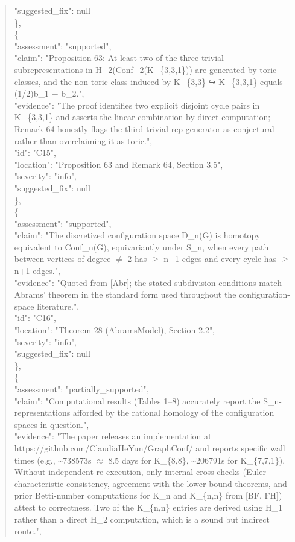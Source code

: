 \documentclass[11pt]{article}
\begin{document}
\begin{quote}
      "suggested\_fix": null\\
    \},\\
    \{\\
      "assessment": "supported",\\
      "claim": "Proposition 63: At least two of the three trivial subrepresentations in H\_2(Conf\_2(K\_\{3,3,1\})) are generated by toric classes, and the non-toric class induced by K\_\{3,3\} ↪ K\_\{3,3,1\} equals (1/2)b\_1 \ensuremath{-} b\_2.",\\
      "evidence": "The proof identifies two explicit disjoint cycle pairs in K\_\{3,3,1\} and asserts the linear combination by direct computation; Remark 64 honestly flags the third trivial-rep generator as conjectural rather than overclaiming it as toric.",\\
      "id": "C15",\\
      "location": "Proposition 63 and Remark 64, Section 3.5",\\
      "severity": "info",\\
      "suggested\_fix": null\\
    \},\\
    \{\\
      "assessment": "supported",\\
      "claim": "The discretized configuration space D\_n(G) is homotopy equivalent to Conf\_n(G), equivariantly under S\_n, when every path between vertices of degree \ensuremath{\ne} 2 has \ensuremath{\ge} n\ensuremath{-}1 edges and every cycle has \ensuremath{\ge} n+1 edges.",\\
      "evidence": "Quoted from [Abr]; the stated subdivision conditions match Abrams' theorem in the standard form used throughout the configuration-space literature.",\\
      "id": "C16",\\
      "location": "Theorem 28 (AbramsModel), Section 2.2",\\
      "severity": "info",\\
      "suggested\_fix": null\\
    \},\\
    \{\\
      "assessment": "partially\_supported",\\
      "claim": "Computational results (Tables 1--8) accurately report the S\_n-representations afforded by the rational homology of the configuration spaces in question.",\\
      "evidence": "The paper releases an implementation at https://github.com/ClaudiaHeYun/GraphConf/ and reports specific wall times (e.g., \~{}738573s \ensuremath{\approx} 8.5 days for K\_\{8,8\}, \~{}206791s for K\_\{7,7,1\}). Without independent re-execution, only internal cross-checks (Euler characteristic consistency, agreement with the lower-bound theorems, and prior Betti-number computations for K\_n and K\_\{n,n\} from [BF, FH]) attest to correctness. Two of the K\_\{n,n\} entries are derived using H\_1 rather than a direct H\_2 computation, which is a sound but indirect route.",\\

\end{quote}
\end{document}
